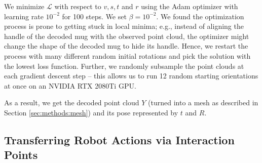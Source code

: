 \documentclass{article}
\begin{document}
We minimize $\mathcal{L}$ with respect to $v, s, t$ and $r$ using the Adam optimizer \cite{kingma17adam} with learning rate $10^{-2}$ for 100 steps. We set $\beta=10^{-2}$. We found the optimization process is prone to getting stuck in local minima; e.g., instead of aligning the handle of the decoded mug with the observed point cloud, the optimizer might change the shape of the decoded mug to hide its handle. Hence, we restart the process with many different random initial rotations and pick the solution with the lowest loss function. Further, we randomly subsample the point clouds at each gradient descent step -- this allows us to run 12 random starting orientations at once on an NVIDIA RTX 2080Ti GPU.

As a result, we get the decoded point cloud $Y$ (turned into a mesh as described in Section \ref{sec:methods:mesh}) and its pose represented by $t$ and $R$.

\subsection{Transferring Robot Actions via Interaction Points}
\end{document}

